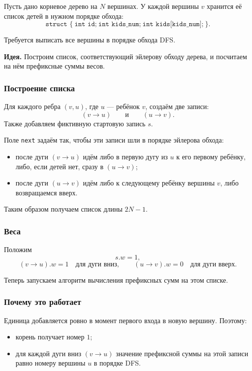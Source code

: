 	\begin{Proposition}{}{}
		Пусть дано корневое дерево на $N$ вершинах.  
		У каждой вершины $v$ хранится её список детей в нужном порядке обхода:
		\[
		\texttt{struct }\{
		\ \texttt{int id;}
		\ \texttt{int kids\_num;}
		\ \texttt{int kids[kids\_num];}
		\ \}.
		\]
		
		Требуется выписать все вершины в порядке обхода DFS.
	\end{Proposition}
	
	\textbf{Идея.}
	Построим список, соответствующий эйлерову обходу дерева, и посчитаем на нём префиксные суммы весов.
	
	\subsubsection*{Построение списка}
	
	Для каждого ребра $(v,u)$, где $u$ --- ребёнок $v$, создаём две записи:
	\[
	(v\to u)
	\qquad\text{и}\qquad
	(u\to v).
	\]
	Также добавляем фиктивную стартовую запись $s$.
	
	Поле \texttt{next} задаём так, чтобы эти записи шли в порядке эйлерова обхода:
	\begin{itemize}
		\item после дуги $(v\to u)$ идём либо в первую дугу из $u$ к его первому ребёнку, либо, если детей нет, сразу в $(u\to v)$;
		\item после дуги $(u\to v)$ идём либо к следующему ребёнку вершины $v$, либо возвращаемся вверх.
	\end{itemize}
	
	Таким образом получаем список длины $2N-1$.
	
	\subsubsection*{Веса}
	
	Положим
	\[
	s.w=1,
	\]
	\[
	(v\to u).w=1 \quad \text{для дуги вниз},
	\qquad
	(u\to v).w=0 \quad \text{для дуги вверх}.
	\]
	
	Теперь запускаем алгоритм вычисления префиксных сумм на этом списке.
	
	\subsubsection*{Почему это работает}
	
	Единица добавляется ровно в момент первого входа в новую вершину.  
	Поэтому:
	\begin{itemize}
		\item корень получает номер $1$;
		\item для каждой дуги вниз $(v\to u)$ значение префиксной суммы на этой записи равно номеру вершины $u$ в порядке DFS.
	\end{itemize}
	
